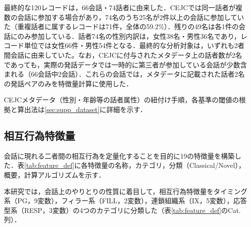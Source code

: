 \documentclass[dvipdfmx,11pt,a4paper]{bxjsarticle}
\renewcommand{\_}{\paperorigunderscore\allowbreak}%
\begin{document}


最終的な120レコードは，66会話・74話者に由来した．CEJCでは同一話者が複数の会話に参加する場合があり，74名のうち25名が2件以上の会話に参加していた（重複話者に属するレコードは71件，全体の59.2\%）．残りの49名は各1件の会話にのみ参加している．話者74名の性別内訳は，女性38名・男性36名であり，レコード単位では女性66件・男性54件となる．最終的な分析対象は，いずれも2者間会話に由来していた。なお，CEJCに付与されたメタデータ上の話者数が2名であっても，実際の発話データでは一時的に第三者が参加している会話が少数含まれる（66会話中2会話）．これらの会話では，メタデータに記載された話者2名の発話ペアのみを特徴量計算に使用した．

CEJCメタデータ（性別・年齢等の話者属性）の紐付け手順，各基準の閾値の根拠と算出法は\ref{sec:supp_dataset}に詳細を示す．


\subsection{相互行為特徴量}
\label{sec:features}


会話に現れる二者間の相互行為を定量化することを目的に19の特徴量を構築した．表\ref{tab:feature_def}に各特徴量の名称，カテゴリ，分類（Classical/Novel），概要，計算アルゴリズムを示す．



本研究では，会話上のやりとりの性質に着目して，相互行為特徴量をタイミング系（PG，9変数），フィラー系（FILL，2変数），連鎖組織系（IX，5変数），応答型系（RESP，3変数）の4つのカテゴリに分類した（表\ref{tab:feature_def}のCat.列）．

\end{document}
